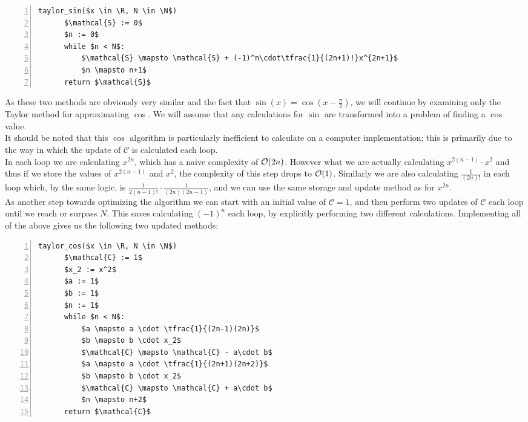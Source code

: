 {\begin{lstlisting}[numbers=left,frame=single,mathescape,caption={Taylor computation of \(\cos\) and \(\sin\)},label={PCD_"Taylor Cos/Sin"}]
  taylor_sin($x \in \R, N \in \N$)
      $\mathcal{S} := 0$
      $n := 0$
      while $n < N$:
          $\mathcal{S} \mapsto \mathcal{S} + (-1)^n\cdot\tfrac{1}{(2n+1)!}x^{2n+1}$
          $n \mapsto n+1$
      return $\mathcal{S}$
\end{lstlisting}

As these two methods are obviously very similar and the fact that \(\sin(x) = \cos(x - \frac{\pi}{2})\), we will continue by examining only the Taylor method for approximating \(\cos\). We will assume that any calculations for \(\sin\) are transformed into a problem of finding a \(\cos\) value.\\

It should be noted that this \(\cos\) algorithm is particularly inefficient to calculate on a computer implementation; this is primarily due to the way in which the update of \(\mathcal{C}\) is calculated each loop.\\

In each loop we are calculating \(x^{2n}\), which has a naive complexity of \(\mathcal{O}(2n)\). However what we are actually calculating \(x^{2(n-1)}\cdot x^2\) and thus if we store the values of \(x^{2(n-1)}\) and \(x^2\), the complexity of this step drops to \(\mathcal{O}(1)\). Similarly we are also calculating \(\tfrac{1}{(2n)!}\) in each loop which, by the same logic, is \(\tfrac{1}{2(n-1)!} \cdot \tfrac{1}{(2n)(2n-1)}\), and we can use the same storage and update method as for \(x^{2n}\).\\

As another step towards optimizing the algorithm we can start with an initial value of \(\mathcal{C} = 1\), and then perform two updates of \(\mathcal{C}\) each loop until we reach or surpass \(N\). This saves calculating \((-1)^n\) each loop, by explicitly performing two different calculations. Implementing all of the above gives us the following two updated methods:

\begin{lstlisting}[numbers=left,frame=single,mathescape,caption={Taylor computation of \(\cos\) optimised},label={PCD_"Taylor Cos opt"}]
  taylor_cos($x \in \R, N \in \N$)
      $\mathcal{C} := 1$
      $x_2 := x^2$
      $a := 1$
      $b := 1$
      $n := 1$
      while $n < N$:
          $a \mapsto a \cdot \tfrac{1}{(2n-1)(2n)}$
          $b \mapsto b \cdot x_2$
          $\mathcal{C} \mapsto \mathcal{C} - a\cdot b$
          $a \mapsto a \cdot \tfrac{1}{(2n+1)(2n+2)}$
          $b \mapsto b \cdot x_2$
          $\mathcal{C} \mapsto \mathcal{C} + a\cdot b$
          $n \mapsto n+2$
      return $\mathcal{C}$
\end{lstlisting}

}
